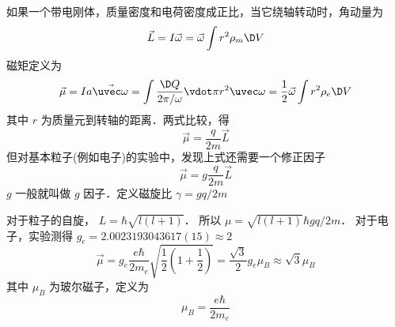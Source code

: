 如果一个带电刚体，质量密度和电荷密度成正比，当它绕轴转动时，角动量为
\begin{equation}
\vec L = I\vec \omega  = \vec \omega \int {{r^2}{\rho _m}\D V} 
\end{equation}
磁矩定义为
\begin{equation}
\vec \mu  = Ia \vec{\uvec\omega}= \int {\frac{{\D Q}}{{{{2\pi } \mathord{\left/
 {\vphantom {{2\pi } \omega }} \right.
 \kern-\nulldelimiterspace} \omega }}} \vdot \pi {r^2}\uvec \omega }  = \frac{1}{2}\vec \omega \int {{r^2}{\rho _e}\D V} 
\end{equation}
其中 $r$ 为质量元到转轴的距离．两式比较，得
\begin{equation}
\vec \mu  = \frac{q}{{2m}}\vec L
\end{equation}
但对基本粒子(例如电子)的实验中，发现上式还需要一个修正因子
\begin{equation}
\vec \mu  = g\frac{q}{{2m}}\vec L
\end{equation}
$g$ 一般就叫做 $g$ 因子．定义磁旋比 $\gamma  = gq/{2m}$


对于粒子的自旋， $L = \hbar \sqrt {l\left( {l + 1} \right)} $． 所以 $\mu  = \sqrt {l\left( {l + 1} \right)}\hbar g{{q}}/{{2m}} $． 
对于电子，实验测得 ${g_e} = 2.0023193043617(15) \approx 2$ 
\begin{equation}
\vec \mu  = {g_e}\frac{{e\hbar }}{{2{m_e}}}\sqrt {\frac{1}{2}\left( {1 + \frac{1}{2}} \right)}  = \frac{{\sqrt 3 }}{2}{g_e}{\mu _B} \approx \sqrt 3 {\mu _B}
\end{equation}
其中 ${\mu _B}$ 为玻尔磁子，定义为
\begin{equation}
{\mu _B} = \frac{{e\hbar }}{{2{m_e}}}
\end{equation}

